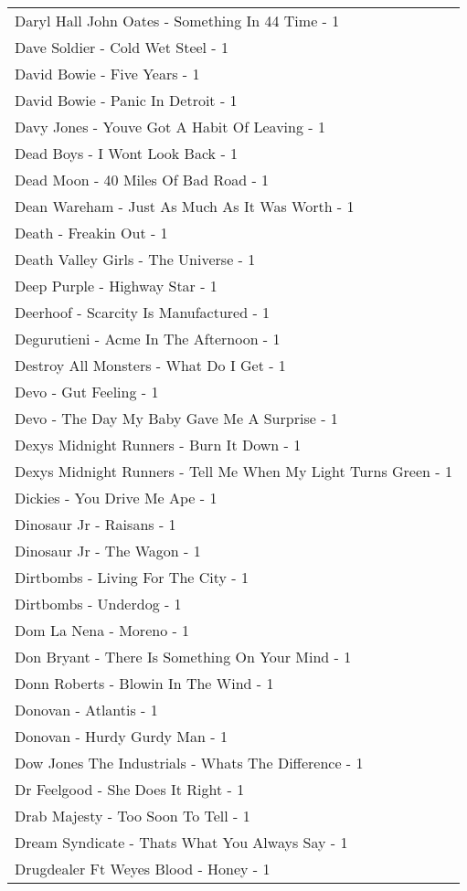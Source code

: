 \documentclass[
]{article}
\begin{document}
\begin{longtable}{l}
Daryl Hall John Oates - Something In 44 Time - 1 \\ 
Dave Soldier - Cold Wet Steel - 1 \\ 
David Bowie - Five Years - 1 \\ 
David Bowie - Panic In Detroit - 1 \\ 
Davy Jones - Youve Got A Habit Of Leaving - 1 \\ 
Dead Boys - I Wont Look Back - 1 \\ 
Dead Moon - 40 Miles Of Bad Road - 1 \\ 
Dean Wareham - Just As Much As It Was Worth - 1 \\ 
Death - Freakin Out - 1 \\ 
Death Valley Girls - The Universe - 1 \\ 
Deep Purple - Highway Star - 1 \\ 
Deerhoof - Scarcity Is Manufactured - 1 \\ 
Degurutieni - Acme In The Afternoon - 1 \\ 
Destroy All Monsters - What Do I Get - 1 \\ 
Devo - Gut Feeling - 1 \\ 
Devo - The Day My Baby Gave Me A Surprise - 1 \\ 
Dexys Midnight Runners - Burn It Down - 1 \\ 
Dexys Midnight Runners - Tell Me When My Light Turns Green - 1 \\ 
Dickies - You Drive Me Ape - 1 \\ 
Dinosaur Jr - Raisans - 1 \\ 
Dinosaur Jr - The Wagon - 1 \\ 
Dirtbombs - Living For The City - 1 \\ 
Dirtbombs - Underdog - 1 \\ 
Dom La Nena - Moreno - 1 \\ 
Don Bryant - There Is Something On Your Mind - 1 \\ 
Donn Roberts - Blowin In The Wind - 1 \\ 
Donovan - Atlantis - 1 \\ 
Donovan - Hurdy Gurdy Man - 1 \\ 
Dow Jones The Industrials - Whats The Difference - 1 \\ 
Dr Feelgood - She Does It Right - 1 \\ 
Drab Majesty - Too Soon To Tell - 1 \\ 
Dream Syndicate - Thats What You Always Say - 1 \\ 
Drugdealer Ft Weyes Blood - Honey - 1 \\ 

\end{longtable}
\end{document}
